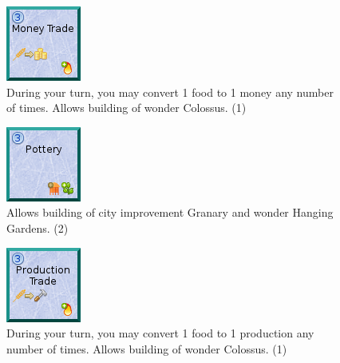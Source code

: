 \documentclass[11pt,a4paper,titlepage]{article}
\begin{document}
{{  \begin{figure}[!htb]
    \begin{minipage}[c]{0.1\textwidth}
      \includegraphics[scale=.7]{doe_tech_money_trade.png}
    \end{minipage}\hfill
    \begin{minipage}[c]{0.6\textwidth}
      \captionsetup{labelformat=empty, justification=justified, singlelinecheck=false}
      \caption{During your turn, you may convert 1 food to 1 money any number of times. Allows building of wonder Colossus. (1)}
    \end{minipage}\hfill
    \label{fig:tech_money_trade}
  \end{figure}

  \begin{figure}[!htb]
    \begin{minipage}[c]{0.1\textwidth}
      \includegraphics[scale=.7]{doe_tech_pottery.png}
    \end{minipage}\hfill
    \begin{minipage}[c]{0.6\textwidth}
      \captionsetup{labelformat=empty, justification=justified, singlelinecheck=false}
      \caption{Allows building of city improvement Granary and wonder Hanging Gardens. (2)}
    \end{minipage}\hfill
    \label{fig:tech_pottery}
  \end{figure}

  \begin{figure}[!htb]
    \begin{minipage}[c]{0.1\textwidth}
      \includegraphics[scale=.7]{doe_tech_production_trade.png}
    \end{minipage}\hfill
    \begin{minipage}[c]{0.6\textwidth}
      \captionsetup{labelformat=empty, justification=justified, singlelinecheck=false}
      \caption{During your turn, you may convert 1 food to 1 production any number of times. Allows building of wonder Colossus. (1)}
    \end{minipage}\hfill
    \label{fig:tech_production_trade}
  \end{figure}

}}
\end{document}
